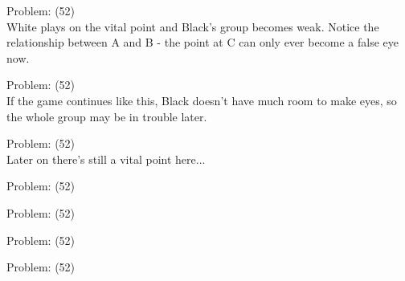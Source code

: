 \documentclass[11pt]{article}
\begin{document}
\begin{minipage}[t]{0.5\textwidth}
  {\centering
  
  Problem: (52)\\
  White plays on the vital point and Black's group becomes weak. Notice the relationship between A and B - the point at C can only ever become a false eye now.\\
  }
\end{minipage}
\begin{minipage}[t]{0.5\textwidth}
  {\centering
  
  Problem: (52)\\
  If the game continues like this, Black doesn't have much room to make eyes, so the whole group may be in trouble later.\\
  }
\end{minipage}
\begin{minipage}[t]{0.5\textwidth}
  {\centering
  
  Problem: (52)\\
  Later on there's still a vital point here...\\
  }
\end{minipage}
\begin{minipage}[t]{0.5\textwidth}
  {\centering
  
  Problem: (52)\\
  
  }
\end{minipage}
\begin{minipage}[t]{0.5\textwidth}
  {\centering
  
  Problem: (52)\\
  
  }
\end{minipage}
\begin{minipage}[t]{0.5\textwidth}
  {\centering
  
  Problem: (52)\\
  
  }
\end{minipage}
\begin{minipage}[t]{0.5\textwidth}
  {\centering
  
  Problem: (52)\\
  
  }
\end{minipage}
\end{document}

